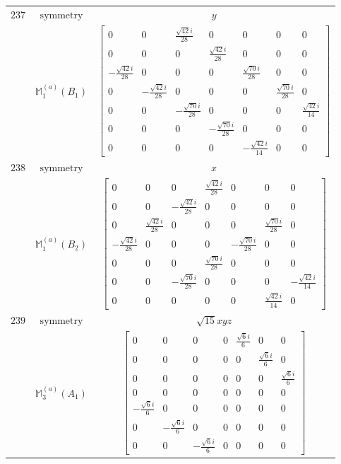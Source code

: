 \documentclass[fleqn,8pt,landscape]{jsarticle}
\begin{document}
\begin{longtable}{ccc}
$ 237 $ & $ \text{symmetry} $ & $ y $ \\
$  $ & $ \mathbb{M}_{1}^{(a)}(B_{1}) $ & $ \begin{bmatrix} 0 & 0 & \frac{\sqrt{42} i}{28} & 0 & 0 & 0 & 0 \\ 0 & 0 & 0 & \frac{\sqrt{42} i}{28} & 0 & 0 & 0 \\ - \frac{\sqrt{42} i}{28} & 0 & 0 & 0 & \frac{\sqrt{70} i}{28} & 0 & 0 \\ 0 & - \frac{\sqrt{42} i}{28} & 0 & 0 & 0 & \frac{\sqrt{70} i}{28} & 0 \\ 0 & 0 & - \frac{\sqrt{70} i}{28} & 0 & 0 & 0 & \frac{\sqrt{42} i}{14} \\ 0 & 0 & 0 & - \frac{\sqrt{70} i}{28} & 0 & 0 & 0 \\ 0 & 0 & 0 & 0 & - \frac{\sqrt{42} i}{14} & 0 & 0 \end{bmatrix} $ \\ \hline
$ 238 $ & $ \text{symmetry} $ & $ x $ \\
$  $ & $ \mathbb{M}_{1}^{(a)}(B_{2}) $ & $ \begin{bmatrix} 0 & 0 & 0 & \frac{\sqrt{42} i}{28} & 0 & 0 & 0 \\ 0 & 0 & - \frac{\sqrt{42} i}{28} & 0 & 0 & 0 & 0 \\ 0 & \frac{\sqrt{42} i}{28} & 0 & 0 & 0 & \frac{\sqrt{70} i}{28} & 0 \\ - \frac{\sqrt{42} i}{28} & 0 & 0 & 0 & - \frac{\sqrt{70} i}{28} & 0 & 0 \\ 0 & 0 & 0 & \frac{\sqrt{70} i}{28} & 0 & 0 & 0 \\ 0 & 0 & - \frac{\sqrt{70} i}{28} & 0 & 0 & 0 & - \frac{\sqrt{42} i}{14} \\ 0 & 0 & 0 & 0 & 0 & \frac{\sqrt{42} i}{14} & 0 \end{bmatrix} $ \\ \hline
$ 239 $ & $ \text{symmetry} $ & $ \sqrt{15} x y z $ \\
$  $ & $ \mathbb{M}_{3}^{(a)}(A_{1}) $ & $ \begin{bmatrix} 0 & 0 & 0 & 0 & \frac{\sqrt{6} i}{6} & 0 & 0 \\ 0 & 0 & 0 & 0 & 0 & \frac{\sqrt{6} i}{6} & 0 \\ 0 & 0 & 0 & 0 & 0 & 0 & \frac{\sqrt{6} i}{6} \\ 0 & 0 & 0 & 0 & 0 & 0 & 0 \\ - \frac{\sqrt{6} i}{6} & 0 & 0 & 0 & 0 & 0 & 0 \\ 0 & - \frac{\sqrt{6} i}{6} & 0 & 0 & 0 & 0 & 0 \\ 0 & 0 & - \frac{\sqrt{6} i}{6} & 0 & 0 & 0 & 0 \end{bmatrix} $ \\ \hline

\end{longtable}
\end{document}
